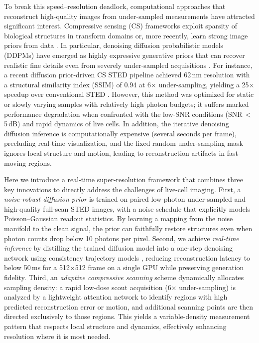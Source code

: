 \documentclass{article}
\begin{document}
To break this speed–resolution deadlock, computational approaches that reconstruct high-quality images from under-sampled measurements have attracted significant interest. Compressive sensing (CS) frameworks exploit sparsity of biological structures in transform domains or, more recently, learn strong image priors from data \cite{wu2023compressiveSTED, qiao2021deep}. In particular, denoising diffusion probabilistic models (DDPMs) have emerged as highly expressive generative priors that can recover realistic fine details even from severely under-sampled acquisitions \cite{ho2020denoising, wang2024diffusionsted}. For instance, a recent diffusion prior-driven CS STED pipeline achieved 62\,nm resolution with a structural similarity index (SSIM) of 0.94 at 6$\times$ under-sampling, yielding a 25$\times$ speedup over conventional STED \cite{wang2024diffusionsted}. However, this method was optimized for static or slowly varying samples with relatively high photon budgets; it suffers marked performance degradation when confronted with the low-SNR conditions (SNR\,$<\,$5\,dB) and rapid dynamics of live cells. In addition, the iterative denoising diffusion inference is computationally expensive (several seconds per frame), precluding real-time visualization, and the fixed random under-sampling mask ignores local structure and motion, leading to reconstruction artifacts in fast-moving regions.

Here we introduce a real-time super-resolution framework that combines three key innovations to directly address the challenges of live-cell imaging. First, a \emph{noise-robust diffusion prior} is trained on paired low-photon under-sampled and high-quality full-scan STED images, with a noise schedule that explicitly models Poisson–Gaussian readout statistics. By learning a mapping from the noise manifold to the clean signal, the prior can faithfully restore structures even when photon counts drop below 10 photons per pixel. Second, we achieve \emph{real-time inference} by distilling the trained diffusion model into a one-step denoising network using consistency trajectory models \cite{song2023consistency}, reducing reconstruction latency to below 50\,ms for a 512$\times$512 frame on a single GPU while preserving generation fidelity. Third, an \emph{adaptive compressive scanning} scheme dynamically allocates sampling density: a rapid low-dose scout acquisition (6$\times$ under-sampling) is analyzed by a lightweight attention network to identify regions with high predicted reconstruction error or motion, and additional scanning points are then directed exclusively to those regions. This yields a variable-density measurement pattern that respects local structure and dynamics, effectively enhancing resolution where it is most needed.
\end{document}
